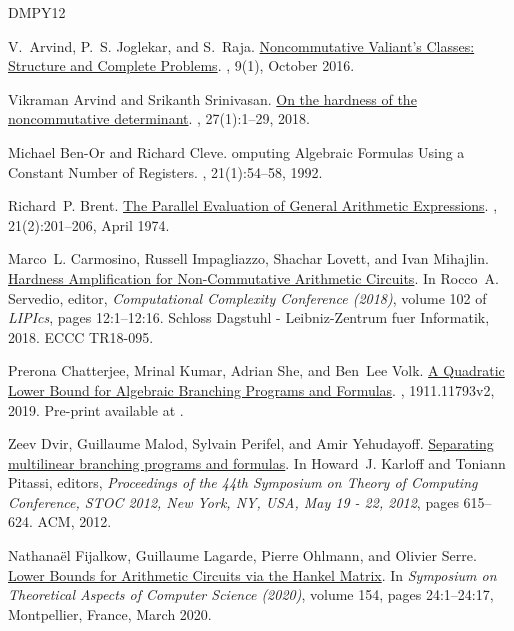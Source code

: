 \documentclass[10pt,a4paper]{article}
\begin{document}
\begin{thebibliography}{DMPY12}

V.~Arvind, P.~S. Joglekar, and S.~Raja.
\newblock \href {http://dx.doi.org/10.1145/2956230} {Noncommutative Valiant's
  Classes: Structure and Complete Problems}.
, 9(1), October 2016.

Vikraman Arvind and Srikanth Srinivasan.
\newblock \href {http://dx.doi.org/10.1007/s00037-016-0148-5} {On the hardness
  of the noncommutative determinant}.
, 27(1):1--29, 2018.

Michael {Ben-Or} and Richard Cleve.
omputing {A}lgebraic {F}ormulas {U}sing a {C}onstant {N}umber of
  {R}egisters.
, 21(1):54--58, 1992.

Richard~P. Brent.
\newblock \href {http://dx.doi.org/10.1145/321812.321815} {The Parallel
  Evaluation of General Arithmetic Expressions}.
, 21(2):201--206, April 1974.

Marco~L. Carmosino, Russell Impagliazzo, Shachar Lovett, and Ivan Mihajlin.
\newblock \href {http://dx.doi.org/10.4230/LIPIcs.CCC.2018.12} {Hardness
  Amplification for Non-Commutative Arithmetic Circuits}.
\newblock In Rocco~A. Servedio, editor, {\em Computational Complexity Conference (2018)}, volume 102 of {\em
  LIPIcs}, pages 12:1--12:16. Schloss Dagstuhl - Leibniz-Zentrum fuer
  Informatik, 2018.
\newblock ECCC TR18-095.

Prerona Chatterjee, Mrinal Kumar, Adrian She, and Ben~Lee Volk.
\newblock \href {http://arxiv.org/abs/1911.11793v2} {A Quadratic Lower Bound
  for Algebraic Branching Programs and Formulas}.
, 1911.11793v2, 2019.
\newblock Pre-print available at \href {http://arxiv.org/abs/1911.11793v2}
  {}.

Zeev Dvir, Guillaume Malod, Sylvain Perifel, and Amir Yehudayoff.
\newblock \href {http://dx.doi.org/10.1145/2213977.2214034} {Separating
  multilinear branching programs and formulas}.
\newblock In Howard~J. Karloff and Toniann Pitassi, editors, {\em Proceedings
  of the 44th Symposium on Theory of Computing Conference, {STOC} 2012, New
  York, NY, USA, May 19 - 22, 2012}, pages 615--624. {ACM}, 2012.

Nathana{\"e}l Fijalkow, Guillaume Lagarde, Pierre Ohlmann, and Olivier Serre.
\newblock \href {https://hal.archives-ouvertes.fr/hal-02440692} {{Lower Bounds
  for Arithmetic Circuits via the Hankel Matrix}}.
\newblock In {\em Symposium on Theoretical Aspects of Computer Science (2020)}, volume 154, pages 24:1--24:17, Montpellier,
  France, March 2020.


\end{thebibliography}
\end{document}

